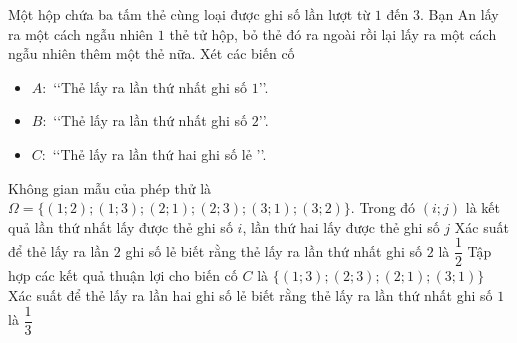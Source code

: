 \cauds
\begin{ex}%
	Một hộp chứa ba tấm thẻ cùng loại được ghi số lần lượt từ $1$ đến $3$. Bạn An lấy ra một cách ngẫu nhiên $1$ thẻ tử hộp, bỏ thẻ đó ra ngoài rồi lại lấy ra một cách ngẫu nhiên thêm một thẻ nữa. Xét các biến cố
	\begin{itemize}
		\item $A\colon$ \lq\lq Thẻ lấy ra lần thứ nhất ghi số $1$\rq\rq.
		\item $B\colon$ \lq\lq Thẻ lấy ra lần thứ nhất ghi số $2$\rq\rq.
		\item $C\colon$ \lq\lq Thẻ lấy ra lần thứ hai ghi số lẻ \rq\rq.
	\end{itemize}
	\choiceTF
	{\True Không gian mẫu của phép thử là $\Omega =\{(1;2);(1;3);(2;1);(2;3);(3;1);(3;2)\}$. Trong đó $(i;j)$ là kết quả lần thứ nhất lấy được thẻ ghi số $i$, lần thứ hai lấy được thẻ ghi số $j$}
	{Xác suất để thẻ lấy ra lần $2$ ghi số lẻ biết rằng thẻ lấy ra lần thứ nhất ghi số $2$ là $\dfrac{1}{2}$}
	{\True Tập hợp các kết quả thuận lợi cho biến cố $C$ là $\{(1;3);(2;3);(2;1);(3;1)\}$}
	{Xác suất để thẻ lấy ra lần hai ghi số lẻ biết rằng thẻ lấy ra lần thứ nhất ghi số $1$ là $\dfrac{1}{3}$}
\end{ex}

